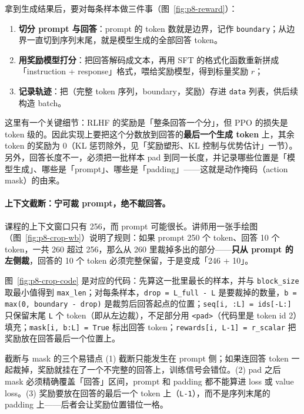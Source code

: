 拿到生成结果后，要对每条样本做三件事（图~\ref{fig:p8-reward}）：

\begin{enumerate}
\item \textbf{切分 prompt 与回答}：prompt 的 token 数就是边界，记作 \texttt{boundary}；从边界一直切到序列末尾，就是模型生成的全部回答 token。
\item \textbf{用奖励模型打分}：把回答解码成文本，再用 SFT 的格式化函数重新拼成「instruction + response」格式，喂给奖励模型，得到标量奖励 $r$；
\item \textbf{记录轨迹}：把（完整 token 序列，boundary，奖励）存进 \texttt{data} 列表，供后续构造 batch。
\end{enumerate}

这里有一个关键细节：RLHF 的奖励是「整条回答一个分」，但 PPO 的损失是 token 级的。因此实现上要把这个分数放到回答的\textbf{最后一个生成 token} 上，其余 token 的奖励为 0（KL 惩罚除外，见「奖励塑形、KL 控制与优势估计」一节）。另外，回答长度不一，必须把一批样本 pad 到同一长度，并记录哪些位置是「模型生成」、哪些是「prompt」、哪些是「padding」——这就是动作掩码（action mask）的由来。

\paragraph{上下文截断：宁可裁 prompt，绝不裁回答。}课程的上下文窗口只有 256，而 prompt 可能很长。讲师用一张手绘图（图~\ref{fig:p8-crop-wb}）说明了规则：如果 prompt 250 个 token、回答 10 个 token，一共 260 超过 256，那么从 260 里裁掉多出的部分——\textbf{只从 prompt 的左侧裁}，回答的 10 个 token 必须完整保留，于是变成「246 + 10」。

图~\ref{fig:p8-crop-code} 是对应的代码：先算这一批里最长的样本，并与 \texttt{block\_size} 取最小值得到 \texttt{max\_len}；对每条样本，\texttt{drop = L\_full - L} 是要裁掉的数量，\texttt{b = max(0, boundary - drop)} 是裁剪后回答起点的位置；\texttt{seq[i, :L] = ids[-L:]} 只保留末尾 \texttt{L} 个 token（即从左边裁），不足部分用 \texttt{<pad>}（代码里是 token id 2）填充；\texttt{mask[i, b:L] = True} 标出回答 token；\texttt{rewards[i, L-1] = r\_scalar} 把奖励放在回答最后一个位置上。

\begin{warningbox}{截断与 mask 的三个易错点}
(1) 截断只能发生在 prompt 侧；如果连回答 token 一起裁掉，奖励就挂在了一个不完整的回答上，训练信号会错位。(2) pad 之后 mask 必须精确覆盖「回答」区间，prompt 和 padding 都不能算进 loss 或 value loss。(3) 奖励要放在回答的最后一个 token 上（\texttt{L-1}），而不是序列末尾的 padding 上——后者会让奖励位置错位一格。
\end{warningbox}

